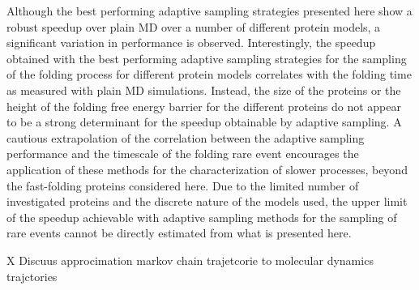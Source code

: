 Although the best performing adaptive sampling strategies presented here show a
robust speedup over plain MD over a number of different protein models, a significant
variation in performance is observed. Interestingly, the
speedup obtained with the best performing adaptive sampling strategies for
the sampling of the folding process for different protein models correlates
with the folding time as measured with plain MD simulations.
Instead, the size of the proteins or the height of the folding free energy
barrier for the different proteins do not appear to be a strong determinant for
the speedup obtainable by adaptive sampling.
A cautious extrapolation of the correlation between the adaptive sampling
performance and the timescale of the folding rare event encourages the
application of these methods for the characterization of slower processes,
beyond the fast-folding proteins considered here. Due to the limited
number of investigated proteins and the discrete nature of the models used,
the upper limit of the speedup achievable with adaptive sampling methods
for the sampling of rare events cannot be directly estimated from what is
presented here.



X Discuus approcimation markov chain trajetcorie to molecular dynamics trajctories 
